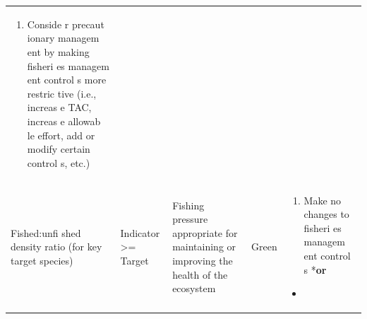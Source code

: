 \documentclass[]{book}
\providecommand{\tightlist}{%
  \setlength{\itemsep}{0pt}\setlength{\parskip}{0pt}}
\begin{document}
\begin{longtable}[]{@{}lllll@{}}
\begin{minipage}[t]{0.19\columnwidth}
\begin{enumerate}
\def\labelenumi{\arabic{enumi}.}
\setcounter{enumi}{1}
\tightlist
\item
  Conside r precaut ionary managem ent by making fisheri es managem ent
  control s more restric tive (i.e., increas e TAC, increas e allowab le
  effort, add or modify certain control s, etc.)
\end{enumerate}\strut
\end{minipage}\tabularnewline
\begin{minipage}[t]{0.19\columnwidth}\raggedright\strut
Fished:unfi shed density ratio (for key target species)\strut
\end{minipage} & \begin{minipage}[t]{0.19\columnwidth}\raggedright\strut
Indicator \textgreater{}= Target\strut
\end{minipage} & \begin{minipage}[t]{0.19\columnwidth}\raggedright\strut
Fishing pressure appropriate for maintaining or improving the health of
the ecosystem\strut
\end{minipage} & \begin{minipage}[t]{0.19\columnwidth}\raggedright\strut
Green\strut
\end{minipage} & \begin{minipage}[t]{0.19\columnwidth}\raggedright\strut
\begin{enumerate}
\def\labelenumi{\arabic{enumi}.}
\tightlist
\item
  Make no changes to fisheri es managem ent control s *\textbf{or}
\end{enumerate}

\begin{itemize}
\item
\end{itemize}


\end{minipage}
\end{longtable}
\end{document}

